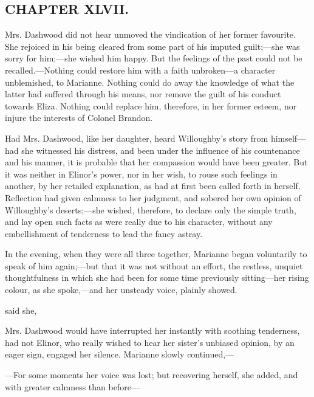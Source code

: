 \subsection[chapter-xlvii.]{\useURL[url47][][][]\from[url47]CHAPTER XLVII.}

Mrs. Dashwood did not hear unmoved the vindication of her former favourite. She rejoiced in his being cleared from some part of his imputed guilt;---she was sorry for him;---she wished him happy. But the feelings of the past could not be recalled.---Nothing could restore him with a faith unbroken---a character unblemished, to Marianne. Nothing could do away the knowledge of what the latter had suffered through his means, nor remove the guilt of his conduct towards Eliza. Nothing could replace him, therefore, in her former esteem, nor injure the interests of Colonel Brandon.

Had Mrs. Dashwood, like her daughter, heard Willoughby's story from himself---had she witnessed his distress, and been under the influence of his countenance and his manner, it is probable that her compassion would have been greater. But it was neither in Elinor's power, nor in her wish, to rouse such feelings in another, by her retailed explanation, as had at first been called forth in herself. Reflection had given calmness to her judgment, and sobered her own opinion of Willoughby's deserts;---she wished, therefore, to declare only the simple truth, and lay open such facts as were really due to his character, without any embellishment of tenderness to lead the fancy astray.

In the evening, when they were all three together, Marianne began voluntarily to speak of him again;---but that it was not without an effort, the restless, unquiet thoughtfulness in which she had been for some time previously sitting---her rising colour, as she spoke,---and her unsteady voice, plainly showed.

 said she, 

Mrs. Dashwood would have interrupted her instantly with soothing tenderness, had not Elinor, who really wished to hear her sister's unbiased opinion, by an eager sign, engaged her silence. Marianne slowly continued,---

---For some moments her voice was lost; but recovering herself, she added, and with greater calmness than before---

